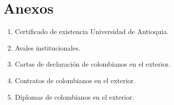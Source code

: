 
\section*{Anexos}
\begin{enumerate}
\item Certificado de existencia Universidad de Antioquia.
\item Avales institucionales.
\item Cartas de declaración de colombianos en el exterior.
\item Contratos de colombianos en el exterior.
\item Diplomas de colombianos en el exterior.
\end{enumerate}

